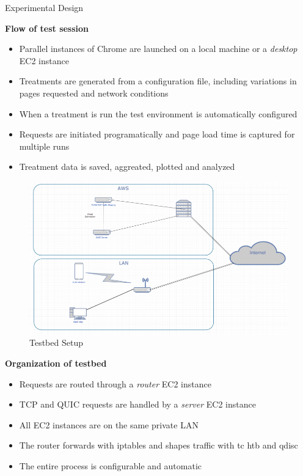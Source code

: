 \documentclass[final]{beamer}
\newlength{\onecolwid}
\begin{document}
\begin{frame}[t]
\begin{columns}[t]
\begin{column}{\onecolwid}
\begin{block}{Experimental Design}

\textbf{Flow of test session}

\begin{itemize}
	\item Parallel instances of Chrome are launched on a local machine or a \textit{desktop} EC2 instance
	\item Treatments are generated from a configuration file, including variations in pages requested and network conditions
	\item When a treatment is run the test environment is automatically configured
	\item Requests are initiated programatically and page load time is captured for multiple runs
	\item Treatment data is saved, aggreated, plotted and analyzed
\end{itemize}

\begin{figure}
\includegraphics[width=0.8\linewidth]{images/Network_diagram.png}
\caption{Testbed Setup}
\end{figure}

\textbf{Organization of testbed}

\begin{itemize}
	\item Requests are routed through a \textit{router} EC2 instance
	\item TCP and QUIC requests are handled by a \textit{server} EC2 instance
	\item All EC2 instances are on the same private LAN
	\item The router forwards with iptables and shapes traffic with tc htb and qdisc
	\item The entire process is configurable and automatic	
\end{itemize}


\end{block}
\end{column}
\end{columns}
\end{frame}
\end{document}
